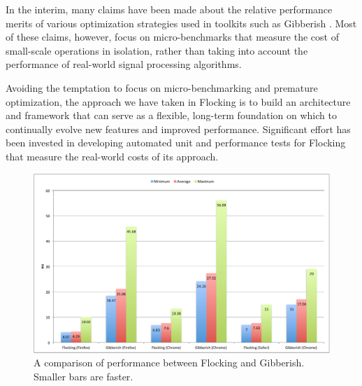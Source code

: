 \documentclass{article}
\begin{document}
In the interim, many claims have been made about the relative performance merits of various optimization strategies used in toolkits such as Gibberish \cite{roberts_web_2013}. Most of these claims, however, focus on micro-benchmarks that measure the cost of small-scale operations in isolation, rather than taking into account the performance of real-world signal processing algorithms.

Avoiding the temptation to focus on micro-benchmarking and premature optimization, the approach we have taken in Flocking is to build an architecture and framework that can serve as a flexible, long-term foundation on which to continually evolve new features and improved performance. Significant effort has been invested in developing automated unit and performance tests for Flocking that measure the real-world costs of its approach.

\begin{figure}[ht]
\centering
\includegraphics[width=0.9\columnwidth]{images/FlockingVsGibberish.pdf}
\caption{ A comparison of performance between Flocking and Gibberish. Smaller bars are faster. \label{fig:flockingvsgibberish}}
\end{figure}
\end{document}
